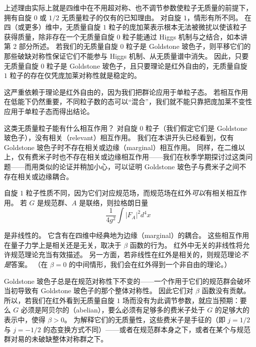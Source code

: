 上述理由实际上就是四维中在不用超对称、也不调节参数使粒子无质量的前提下，拥有自旋 $0$ 或 $1/2$ 无质量粒子的仅有的已知理由。
对自旋 $1$，情形有所不同。
在四（或更多）维中，无质量自旋 $1$ 粒子的庞加莱表示根本无法被微扰以使该粒子获得质量，除非存在一个无质量自旋 $0$ 粒子能通过 Higgs 机制与之结合，如本讲第 2 部分所述。
若我们的无质量自旋 $0$ 粒子是 Goldstone 玻色子，则平移它们的那些破缺对称性保证它们不能参与 Higgs 机制、从无质量谱中消失。
因此，只要无质量自旋 $0$ 粒子是 Goldstone 玻色子，且只要理论是红外自由的，无质量自旋 $1$ 粒子的存在仅凭庞加莱对称性就是稳定的。

这严重依赖于理论是红外自由的，因为我们把群论应用于单粒子态。
若相互作用在低能下仍然重要，不同粒子数的态可以“混合”，我们就不能只靠把庞加莱不变性应用于单粒子态而得出结论。

这类无质量粒子能有什么相互作用？
对自旋 $0$ 粒子（我们假定它们是 Goldstone 玻色子），没有相关（relevant）相互作用。
我们在本讲开头已经看到，仅有 Goldstone 玻色子时不存在相关或边缘（marginal）相互作用。
同样，在二维以上，仅有费米子时也不存在相关或边缘相互作用——我们在秋季学期探讨过这类问题——而用类似的论证并稍加小心，可以证明 Goldstone 玻色子与费米子之间不存在相关或边缘耦合。

自旋 $1$ 粒子性质不同，因为它们对应规范场，而规范场在红外\emph{可以}有相关相互作用。
若 $G$ 是规范群、$A$ 是联络，则拉格朗日量
\[
  \frac{1}{4g^2}\int |F_A|^2 d^4x
\]

是非线性的。
它含有在四维中经典地为边缘（marginal）的耦合。
这些相互作用在量子力学上是相关还是无关，取决于 $\beta$ 函数的行为。
红外中无关的非线性将允许规范理论充当有效描述。
另一方面，若非线性在红外是相关的，则规范理论\emph{不是}答案。
（在 $\beta=0$ 的中间情形，我们会在红外得到一个非自由的理论。）


Goldstone 玻色子总是在规范对称性下不变的——一个作用于它们的规范群会破坏当初导致有 Goldstone 玻色子的那个整体对称性。
因此它们对 $\beta$ 函数没有贡献。
所以，若我们在红外看到无质量自旋 $1$ 场而没有为此调节参数，就应当预期：要么 $G$ 必须是阿贝尔的（abelian），要么必须有足够多的费米子处于 $G$ 的足够大的表示中，使得 $\beta>0$。
为解释它们的无质量性，这些费米子是手征的（即 $j=1/2$ 与 $j=-1/2$ 的态变换方式不同）——或者在规范群本身之下，或者在某个与规范群对易的未破缺整体对称群之下。

